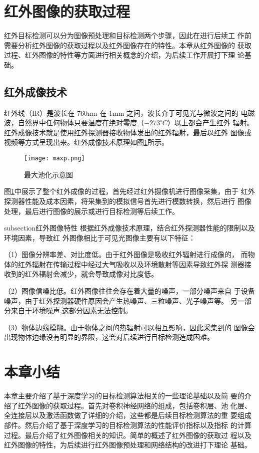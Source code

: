\section{红外图像的获取过程}
红外目标检测可以分为图像预处理和目标检测两个步骤，因此在进行后续工
作前需要分析红外图像的获取过程以及红外图像存在的特性。本章从红外图像的
获取过程、红外图像的特性等方面进行相关概念的介绍，为后续工作开展打下理
论基础。
\subsection{红外成像技术}
红外线（IR）是波长在 760nm 在 1mm 之间，波长介于可见光与微波之间的
电磁波，自然界中任何物体只要温度在绝对零度（$-273 ^{\circ}C$）以上都会产生红外
辐射。红外成像技术就是使用红外探测器接收物体发出的红外辐射，最后以红外
图像或视频等方式呈现出来。红外成像技术原理如图\ref{infra}所示\cite{倪国强2008中国红外成像技术发展的若干思考}。

\begin{figure}[htbp]
    \centering
    \texttt{[image: maxp.png]}
    \caption{最大池化示意图}
    \label{infra}
\end{figure}

图\ref{infra}中展示了整个红外成像的过程，首先经过红外摄像机进行图像采集，由于
红外探测器性能及成本因素，将采集到的模拟信号首先进行模数转换，然后进行
图像处理，最后进行图像的展示或进行目标检测等后续工作。

subsection{红外图像特性} 
根据红外成像技术原理，结合红外探测器性能的限制以及环境因素，导致红
外图像相比于可见光图像主要有以下特征：

（1）图像分辨率差、对比度低。由于红外图像是吸收红外辐射进行成像的，
而物体的红外辐射在传输过程中经过大气吸收以及环境散射等因素导致红外探
测器接收到的红外辐射会减少，就会导致成像对比度低。

（2）图像信噪比低。红外图像往往会存在着大量的噪声，一部分噪声来自
于设备噪声，由于红外探测器硬件原因会产生热噪声、三粒噪声、光子噪声等。
另一部分来自于环境噪声,这部分因素无法控制。

（3）物体边缘模糊。由于物体之间的热辐射可以相互影响，因此采集到的
图像会出现物体边缘没有明显的界限，这会对后续进行目标检测造成困难。

\section{本章小结}
本章主要介绍了基于深度学习的目标检测算法相关的一些理论基础以及简
要的介绍了红外图像的获取过程。首先对卷积神经网络的组成，包括卷积层、池
化层、全连接层以及激活函数做了详细的介绍，这些都是后续目标检测算法的重
要组成部件。然后介绍了基于深度学习的目标检测算法的性能评价指标以及指标
的计算过程。最后介绍了红外图像相关的知识。简单的概述了红外图像的获取过
程以及红外图像的特性，为后续进行红外图像预处理和网络结构的改进打下理论
基础。
